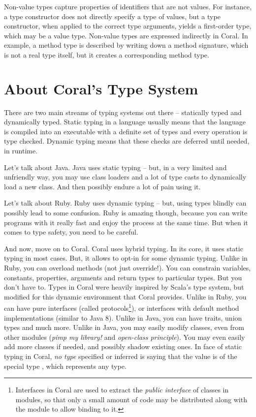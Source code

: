 Non-value types capture properties of identifiers that are not values. For instance, a type constructor does not directly specify a type of values, but a type constructor, when applied to the correct type arguments, yields a first-order type, which may be a value type. Non-value types are expressed indirectly in Coral. In example, a method type is described by writing down a method signature, which is not a real type itself, but it creates a corresponding method type. 






\section{About Coral's Type System}

There are two main streams of typing systems out there -- statically typed and dynamically typed. Static typing in a language usually means that the language is compiled into an executable with a definite set of types and every operation is type checked. Dynamic typing means that these checks are deferred until needed, in runtime. 

Let's talk about Java. Java uses static typing -- but, in a very limited and unfriendly way, you may use class loaders and a lot of type casts to dynamically load a new class. And then possibly endure a lot of pain using it. 

Let's talk about Ruby. Ruby uses dynamic typing -- but, using types blindly can possibly lead to some confusion. Ruby is amazing though, because you can write programs with it really fast and enjoy the process at the same time. But when it comes to type safety, you need to be careful. 

And now, move on to Coral. Coral uses hybrid typing. In its core, it uses static typing in most cases. But, it allows to opt-in for some dynamic typing. Unlike in Ruby, you can overload methods (not just override!). You can constrain variables, constants, properties, arguments and return types to particular types. But you don't have to. Types in Coral were heavily inspired by Scala's type system, but modified for this dynamic environment that Coral provides. Unlike in Ruby, you can have pure interfaces (called protocols\footnote{Interfaces in Coral are used to extract the {\em public interface} of classes in modules, so that only a small amount of code may be distributed along with the module to allow binding to it.}), or interfaces with default method implementations (similar to Java 8). Unlike in Java, you can have traits, union types and much more. Unlike in Java, you may easily modify classes, even from other modules ({\em pimp my library!} and {\em open-class principle}). You may even easily add more classes if needed, and possibly shadow existing ones. In face of static typing in Coral, \textit{no type} specified or inferred is saying that the value is of the special type , which represents any type. 

